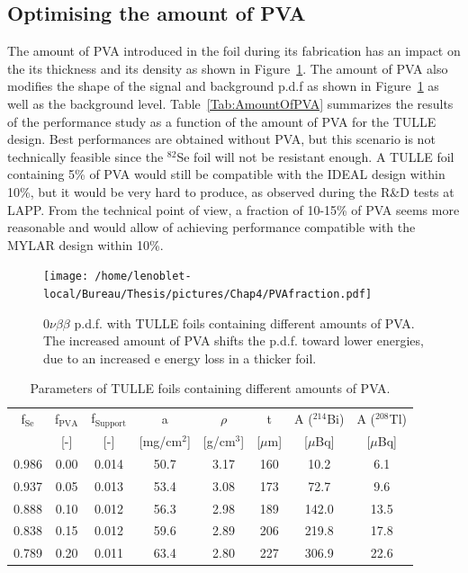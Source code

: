 \documentclass[main.tex]{subfiles}
\begin{document}
\FloatBarrier


\subsection{Optimising the amount of PVA}\label{sec:OptimisingAmountPVA}


\NI The amount of PVA introduced in the foil during its fabrication has an impact on the its thickness and its density as shown in Figure~\ref{Tab:PamameterAmountPVA}. The amount of PVA also modifies the shape of the signal and background p.d.f as shown in Figure~\ref{SpectrumPVA} as well as the background level. Table~\ref{Tab:AmountOfPVA} summarizes the results of the performance study as a function of the amount of PVA for the TULLE design. Best performances are obtained without PVA, but this scenario is not technically feasible since the $^{\text{82}}$Se foil will not be resistant enough. A TULLE foil containing 5\% of PVA would still be compatible with the IDEAL design within 10\%, but it would be very hard to produce, as observed during the R\&D tests at LAPP. From the technical point of view, a fraction of 10-15\% of PVA seems more reasonable and would allow of achieving performance compatible with the MYLAR design within 10\%.


\bigskip	


\begin{figure}[h!]
\centering
\texttt{[image: /home/lenoblet-local/Bureau/Thesis/pictures/Chap4/PVAfraction.pdf]}
\caption{0$\nu\beta\beta$ p.d.f. with TULLE foils containing different amounts of PVA. The increased amount of PVA shifts the p.d.f. toward lower energies, due to an increased e energy loss in a thicker foil.}
\label{SpectrumPVA}
\end{figure}


\begin{table}[h!]
\centering
\begin{tabular}{c|c|c|c|c|c|c|c}
\toprule 
f$_{\text{Se}}$ & f$_{\text{PVA}}$ & f$_{\text{Support}}$ & a & $\rho$ & t & A ($^{\text{214}}$Bi) & A ($^{\text{208}}$Tl) \\ [0.1cm] 
[-] & [-] & [-] & [mg/cm$^\text{2}$] & [g/cm$^\text{3}$] & [$\mu$m] & [$\mu$Bq] & [$\mu$Bq] \\[0.1cm]
\hline 
0.986 & 0.00 & 0.014 & 50.7 & 3.17 & 160 & 10.2 & 6.1 \\ [0.1cm]
\hline 
0.937 & 0.05 & 0.013 & 53.4 & 3.08 & 173 & 72.7 & 9.6 \\ [0.1cm]
\hline 
0.888 & 0.10 & 0.012 & 56.3 & 2.98 & 189 & 142.0 & 13.5 \\ [0.1cm]
\hline 
0.838 & 0.15 & 0.012 & 59.6 & 2.89 & 206 & 219.8 & 17.8 \\ [0.1cm]
\hline 
0.789 & 0.20 & 0.011 & 63.4 & 2.80 & 227 & 306.9 & 22.6 \\ [0.1cm]
\bottomrule 
\end{tabular} 
\caption{Parameters of TULLE foils containing different amounts of PVA.}
\label{Tab:PamameterAmountPVA}
\end{table}
\end{document}
